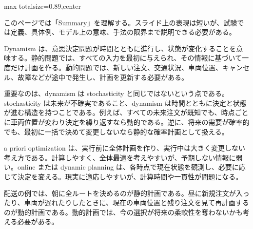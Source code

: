 \begin{minipage}[t]{0.58\textwidth}
\begin{adjustbox}{max totalsize={\textwidth}{0.89\textheight},center}
\begin{minipage}{\textwidth}\scriptsize
{}このページでは「Summary」を理解する。スライド上の表現は短いが、試験では定義、具体例、モデル上の意味、手法の限界まで説明できる必要がある。\par
Dynamism は、意思決定問題が時間とともに進行し、状態が変化することを意味する。静的問題では、すべての入力を最初に与えられ、その情報に基づいて一度だけ計画を作る。動的問題では、新しい注文、交通状況、車両位置、キャンセル、故障などが途中で発生し、計画を更新する必要がある。\par
重要なのは、dynamism は stochasticity と同じではないという点である。stochasticity は未来が不確実であること、dynamism は時間とともに決定と状態が進む構造を持つことである。例えば、すべての未来注文が既知でも、時点ごとに車両位置が変わり決定を繰り返すなら動的である。逆に、将来の需要が確率的でも、最初に一括で決めて変更しないなら静的な確率計画として扱える。\par
a priori optimization は、実行前に全体計画を作り、実行中は大きく変更しない考え方である。計算しやすく、全体最適を考えやすいが、予期しない情報に弱い。online または dynamic planning は、各時点で現在状態を観測し、必要に応じて決定を変える。現実に適応しやすいが、計算時間や一貫性が問題になる。\par
配送の例では、朝に全ルートを決めるのが静的計画である。昼に新規注文が入ったり、車両が遅れたりしたときに、現在の車両位置と残り注文を見て再計画するのが動的計画である。動的計画では、今の選択が将来の柔軟性を奪わないかも考える必要がある。\par

\end{minipage}
\end{adjustbox}
\end{minipage}
